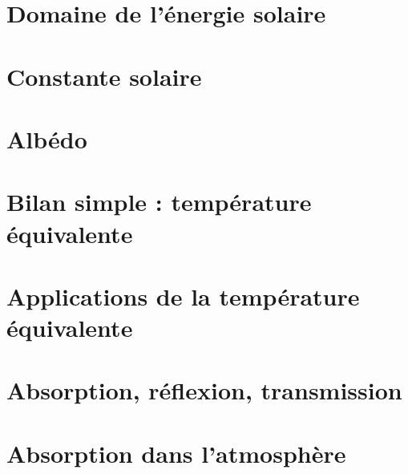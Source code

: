 \documentclass[
	a4paper,
	DIV16,
	10pt]{scrartcl}
\begin{document}
\section{Domaine de l'énergie solaire}


\newpage
\section{Constante solaire}

%

\newpage 
\section{Albédo} 


\newpage
\section{Bilan simple : température équivalente}



\newpage
\section{Applications de la température équivalente}


\newpage
\section{Absorption, réflexion, transmission}



\newpage
\section{Absorption dans l'atmosphère}



%
%
%
\end{document}
